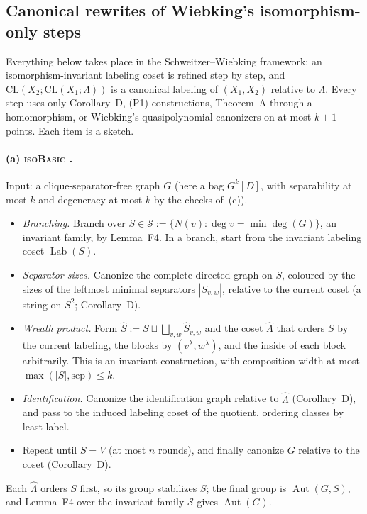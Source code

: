 \documentclass[11pt]{article}
\theoremstyle{plain}
\theoremstyle{definition}
\theoremstyle{remark}
\theoremstyle{named}
\theoremstyle{namedrm}
\newcommand{\Aut}{\operatorname{Aut}}
\newcommand{\Lab}{\operatorname{Lab}}
\newcommand{\cS}{\mathcal{S}}
\begin{document}
\subsection{Canonical rewrites of Wiebking's isomorphism-only steps}

Everything below takes place in the Schweitzer--Wiebking framework: an isomorphism-invariant labeling
coset is refined step by step, and $\mathrm{CL}(X_2;\mathrm{CL}(X_1;\Lambda))$ is a canonical labeling of $(X_1,X_2)$
relative to $\Lambda$. Every step uses only Corollary~D, (P1) constructions, Theorem~A through a homomorphism,
or Wiebking's quasipolynomial canonizers on at most $k+1$ points. Each item is a sketch.

\paragraph{(a) \textsc{isoBasic} \cite[Lemma~32]{Wie20}.} Input: a clique-separator-free graph $G$ (here a
bag $G^k[D]$, with separability at most $k$ and degeneracy at most $k$ by the checks of~(c)).
\begin{itemize}
\item \emph{Branching.} Branch over $S\in\cS:=\{N(v):\deg v=\min\deg(G)\}$, an invariant family, by Lemma~F4. In
  a branch, start from the invariant labeling coset $\Lab(S)$.
\item \emph{Separator sizes.} Canonize the complete directed graph on $S$, coloured by the sizes of the leftmost
  minimal separators $|S_{v,w}|$, relative to the current coset (a string on $S^2$; Corollary~D).
\item \emph{Wreath product.} Form $\hat S:=S\sqcup\bigsqcup_{v,w}\hat S_{v,w}$ and the coset $\hat\Lambda$ that orders $S$ by
  the current labeling, the blocks by $(v^\lambda,w^\lambda)$, and the inside of each block arbitrarily. This is an
  invariant construction, with composition width at most $\max(|S|,\mathrm{sep})\le k$.
\item \emph{Identification.} Canonize the identification graph relative to $\hat\Lambda$ (Corollary~D), and pass to
  the induced labeling coset of the quotient, ordering classes by least label.
\item Repeat until $S=V$ (at most $n$ rounds), and finally canonize $G$ relative to the coset (Corollary~D).
\end{itemize}
Each $\hat\Lambda$ orders $S$ first, so its group stabilizes $S$; the final group is $\Aut(G,S)$, and Lemma~F4 over the
invariant family $\cS$ gives $\Aut(G)$.
\end{document}
